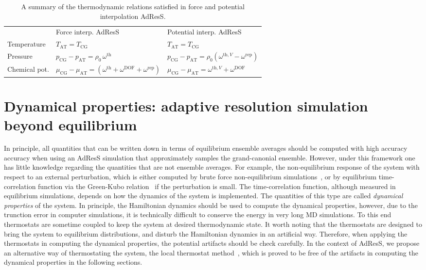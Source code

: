 \documentclass[epjST]{svjour}
\newcommand{\AT}[0]{\textrm{AT}}
\newcommand{\CG}[0]{\textrm{CG}}
\newcommand{\thf}{{\textrm{th}}}
\newcommand{\rep}{{\textrm{rep}}}
\newcommand{\dof}{{\textrm{DOF}}}
\begin{document}
\begin{table}
  \centering
  \caption{A summary of the thermodynamic relations satisfied in force and potential interpolation AdResS.}
  \label{tab:thermodynamic}
  \begin{tabular*}{0.99\textwidth}{@{\extracolsep{\fill}}lll}\hline\hline
    &         Force interp. AdResS     &       Potential interp. AdResS \\
    Temperature    &   {$T_\AT = T_\CG$}                                                & {$T_\AT = T_\CG$}                                        \\
    Pressure       &   {$p_\CG - p_\AT = \rho_0\, \omega^\thf$}                          & {$p_\CG - p_\AT = \rho_0(\omega^{\thf,V} - \omega^\rep)$} \\
    Chemical pot.  &   {$\mu_\CG - \mu_\AT = (\omega^\thf + \omega^\dof +\omega^\rep)$}   & {$\mu_\CG - \mu_\AT = \omega^{\thf,V}+ \omega^\dof$}      \\\hline\hline
  \end{tabular*}
\end{table}


\section{Dynamical properties: adaptive resolution simulation beyond equilibrium}
\label{sec:dynamical}


In principle, all quantities that
can be written down in terms of equilibrium ensemble averages should
be computed with high accuracy accuracy when using an AdResS simulation that approximately samples the grand-canonial ensemble.
However, under this framework one has little knowledge regarding the quantities
that are not ensemble averages.
For example, the non-equilibrium response of the system
with respect to an external perturbation, which is 
either computed by brute force non-equilibrium simulations~\cite{wang2014exploring}, or by
equilibrium time-correlation function via the Green-Kubo
relation~\cite{green1954markoff,kubo1957statistical} if the perturbation is small. The
time-correlation function, although measured in equilibrium
simulations, depends on how the dynamics
of the system is implemented.
The quantities of this type are called \emph{dynamical properties} of the system.
In principle, the Hamiltonian dynamics should be used to compute the dynamical properties,
however, due to the trunction error in computer simulations, it
is technically difficult to conserve the energy in very long MD simulations.
To this end thermostats are sometime coupled to keep the system at desired thermodynamic
state.
It worth noting that the thermostats are designed to bring the system to equilibrium distributions, and 
disturb the Hamiltonian dynamics in an artificial way.
Therefore, when applying the thermostats
in computing the dynamical properties, the potential artifacts
should be check carefully.
In the context of AdResS, we propose an alternative way of thermostating
the system, the local thermostat method~\cite{wang2014exploring},
which is proved to be free of the artifacts in computing the dynamical properties in the following sections.
\end{document}

